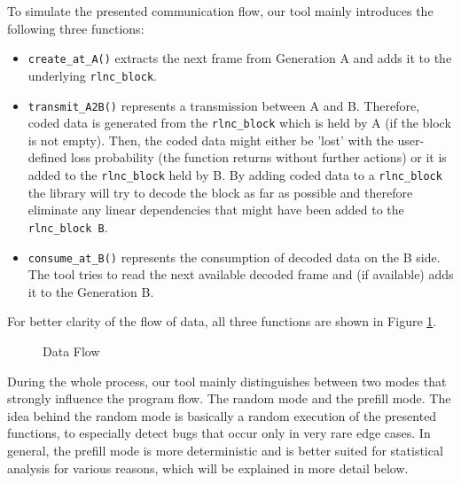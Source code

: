 \documentclass[a4paper,english,10pt]{tumarticle}
\begin{document}
To simulate the presented communication flow, our tool mainly introduces the following three functions:
\begin{itemize}
  \item \texttt{create\_at\_A()} extracts the next frame from Generation A and adds it to the underlying \texttt{rlnc\_block}. 
  \item \texttt{transmit\_A2B()} represents a transmission between A and B. Therefore, coded data is generated from the 
\texttt{rlnc\_block} which is held by A (if the block is not empty). Then, the coded data might either be 'lost' 
with the user-defined loss probability (the function returns without further actions)
or it is added to the \texttt{rlnc\_block} held by B. By adding coded data to a \texttt{rlnc\_block} the library will try to decode the block as far as possible
and therefore eliminate any linear dependencies that might have been added to the \texttt{rlnc\_block B}.
\item \texttt{consume\_at\_B()} represents the consumption of decoded data on the B side. 
The tool tries to read the next available decoded frame and (if available) adds it to the Generation B.
\end{itemize}


For better clarity of the flow of data, all three functions are shown in Figure \ref{fig:func}.

\begin{figure}[h]
  \center
  \caption{Data Flow}
  \label{fig:func}
\end{figure}

During the whole process, our tool mainly distinguishes between two modes that strongly influence the program flow. 
The random mode and the prefill mode. 
The idea behind the random mode is basically a random execution of the presented functions, 
to especially detect bugs that occur only in very rare edge cases.
In general, the prefill mode is more deterministic and is better suited for 
statistical analysis for various reasons, which will be explained in more detail below.
\end{document}
